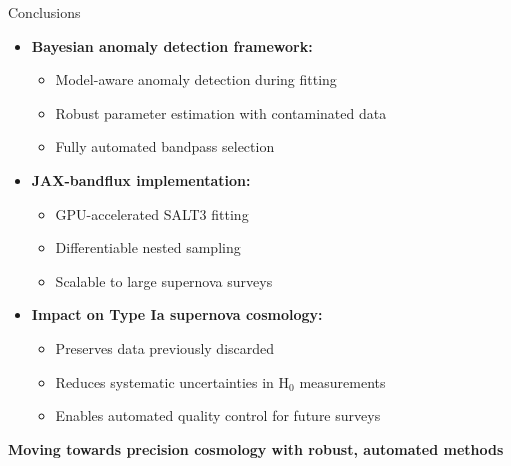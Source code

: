 \documentclass[aspectratio=169]{beamer}
\begin{document}
\begin{frame}{Conclusions}
  \begin{itemize}
    \item \textbf{Bayesian anomaly detection framework:}
      \begin{itemize}
        \item Model-aware anomaly detection during fitting
        \item Robust parameter estimation with contaminated data
        \item Fully automated bandpass selection
      \end{itemize}
    \item \textbf{JAX-bandflux implementation:}
      \begin{itemize}
        \item GPU-accelerated SALT3 fitting
        \item Differentiable nested sampling
        \item Scalable to large supernova surveys
      \end{itemize}
    \item \textbf{Impact on Type Ia supernova cosmology:}
      \begin{itemize}
        \item Preserves data previously discarded
        \item Reduces systematic uncertainties in H$_0$ measurements
        \item Enables automated quality control for future surveys
      \end{itemize}
  \end{itemize}
  \vfill
  \centering
  \textbf{Moving towards precision cosmology with robust, automated methods}
\end{frame}
\end{document}
